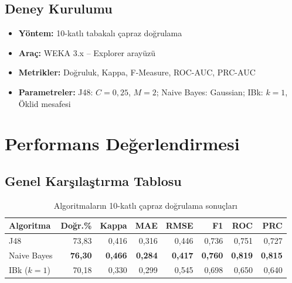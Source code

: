 \documentclass[12pt,a4paper]{article}
\begin{document}
\subsection{Deney Kurulumu}

\begin{tcolorbox}[colback=lgray, colframe=ablue,
                  title={\bfseries\color{white}Değerlendirme Protokolü}]
\begin{itemize}[leftmargin=*]
  \item \textbf{Yöntem:} 10-katlı tabakalı çapraz doğrulama
  \item \textbf{Araç:} WEKA 3.x -- Explorer arayüzü
  \item \textbf{Metrikler:} Doğruluk, Kappa, F-Measure, ROC-AUC, PRC-AUC
  \item \textbf{Parametreler:} J48: $C{=}0{,}25$, $M{=}2$; Naive Bayes: Gaussian; IBk: $k{=}1$, Öklid mesafesi
\end{itemize}
\end{tcolorbox}

\section{Performans Değerlendirmesi}

\subsection{Genel Karşılaştırma Tablosu}

\begin{table}[H]
\centering
\caption{Algoritmaların 10-katlı çapraz doğrulama sonuçları}
\label{tab:results}
\begin{tabular}{@{}lrrrrrrr@{}}
\toprule
\textbf{Algoritma} &
\textbf{Doğr.\%} &
\textbf{Kappa} &
\textbf{MAE} &
\textbf{RMSE} &
\textbf{F1} &
\textbf{ROC} &
\textbf{PRC} \\
\midrule
J48             & 73{,}83 & 0{,}416 & 0{,}316 & 0{,}446 & 0{,}736 & 0{,}751 & 0{,}727 \\
\rowcolor{ablue!15}
Naive Bayes     & \textbf{76{,}30} & \textbf{0{,}466} & \textbf{0{,}284} & \textbf{0{,}417} & \textbf{0{,}760} & \textbf{0{,}819} & \textbf{0{,}815} \\
IBk ($k{=}1$)  & 70{,}18 & 0{,}330 & 0{,}299 & 0{,}545 & 0{,}698 & 0{,}650 & 0{,}640 \\
\bottomrule
\end{tabular}
\end{table}
\end{document}
